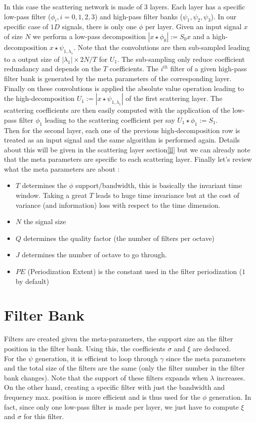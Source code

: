 \documentclass[a4paper]{report}
\begin{document}
In this case the scattering network is made of $3$ layers. Each layer has a specific low-pass filter ($\phi_i,i=0,1,2,3$) and high-pass filter banks ($\psi_1,\psi_2,\psi_3$). In our specific case of $1D$ signals, there is only one $\phi$ per layer. Given an input signal $x$ of size $N$ we perform a low-pass decomposition $|x \star \phi_0|:=S_0x$ and a high-decomposition $ x \star \psi_{1,\lambda_1}$. Note that the convolutions are then sub-sampled leading to a output size of $|\lambda_1| \times 2N/T$ for $U_1$. The sub-sampling only reduce coefficient redundancy and depends on the $T$ coefficients. The $i^{th}$ filter of a given high-pass filter bank is generated by the meta parameters of the corresponding layer.
\\Finally on these convolutions is applied the absolute value operation leading to the high-decomposition $U_1:=|x \star \psi_{1,\lambda_1}|$ of the first scattering layer. The scattering coefficients are then easily computed with the application of the low-pass filter $\phi_1$ leading to the scattering coefficient per say $U_1 \star \phi_1:=S_1$. 
\\
Then for the second layer, each one of the previous high-decomposition row is treated as an input signal and the same algorithm is performed again. Details about this will be given in the scattering layer section\ref{ll} but we can already note that the meta parameters are specific to each scattering layer.
Finally let's review what the meta parameters are about :
\begin{itemize}
\item $T$ determines the $\phi$ support/bandwidth, this is basically the invariant time window. Taking a great $T$ leads to huge time invariance but at the cost of variance (and information) loss with respect to the time dimension.
\item $N$ the signal size
\item $Q$ determines the quality factor (the number of filters per octave)
\item $J$ determines the number of octave to go through.
\item $PE$ (Periodization Extent) is the constant used in the filter periodization ($1$ by default)
\end{itemize}

\section{Filter Bank}
Filters are created given the meta-parameters, the support size an the filter position in the filter bank. Using this, the coefficients $\sigma$ and $\xi$ are deduced.\\
For the $\psi$ generation, it is efficient to loop through $\gamma$ since the meta parameters and the total size of the filters are the same (only the filter number in the filter bank changes). Note that the support of these filters expands when $\lambda$ increases.
On the other hand, creating a specific filter with just the bandwidth and frequency max. position is more efficient and is thus used for the $\phi$ generation. In fact, since only one low-pass filter is made per layer, we just have to compute $\xi$ and $\sigma$ for this filter.
\end{document}
